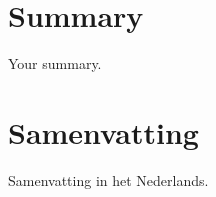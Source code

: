 \chapter*{Summary}

Your summary.

\chapter*{Samenvatting}

{

  Samenvatting in het Nederlands.
}



